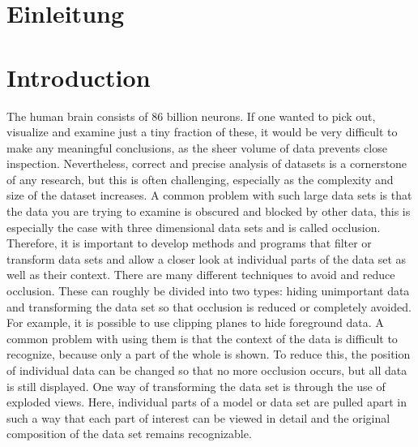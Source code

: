 {\chapter{Einleitung}}
{\chapter{Introduction}}

\label{sec:introduction}

The human brain consists of 86 billion neurons. If one wanted to pick out, visualize and examine just a tiny fraction of these, it would be very difficult to make any meaningful conclusions, as the sheer volume of data prevents close inspection.\cite{peichl_2015}
Nevertheless, correct and precise analysis of datasets is a cornerstone of any research, but this is often challenging, especially as the complexity and size of the dataset increases.
A common problem with such large data sets is that the data you are trying to examine is obscured and blocked by other data, this is especially the case with three dimensional data sets and is called occlusion.
Therefore, it is important to develop methods and programs that filter or transform data sets and allow a closer look at individual parts of the data set as well as their context. 
There are many different techniques to avoid and reduce occlusion. These can roughly be divided into two types: hiding unimportant data and transforming the data set so that occlusion is reduced or completely avoided.
For example, it is possible to use clipping planes to hide foreground data. A common problem with using them is that the context of the data is difficult to recognize, because only a part of the whole is shown. 
To reduce this, the position of individual data can be changed so that no more occlusion occurs, but all data is still displayed. 
One way of transforming the data set is through the use of exploded views. Here, individual parts of a model or data set are pulled apart in such a way that each part of interest can be viewed in detail and the original composition of the data set remains recognizable. 

